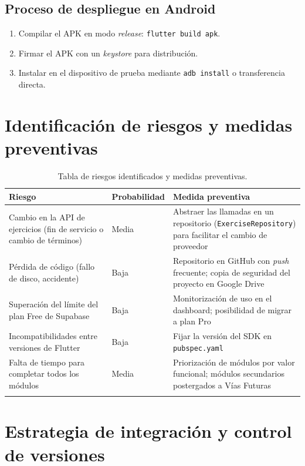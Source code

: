 \subsection{Proceso de despliegue en Android}

\begin{enumerate}
  \item Compilar el APK en modo \textit{release}: \texttt{flutter build apk}.
  \item Firmar el APK con un \textit{keystore} para distribución.
  \item Instalar en el dispositivo de prueba mediante \texttt{adb install} o transferencia directa.
\end{enumerate}

\section{Identificación de riesgos y medidas preventivas}

\begin{longtable}{@{}p{5cm}p{3cm}p{6cm}@{}}
\toprule
\textbf{Riesgo} & \textbf{Probabilidad} & \textbf{Medida preventiva} \\
\midrule
\endhead
Cambio en la API de ejercicios (fin de servicio o cambio de términos) & Media & Abstraer las llamadas en un repositorio (\texttt{ExerciseRepository}) para facilitar el cambio de proveedor \\
Pérdida de código (fallo de disco, accidente) & Baja & Repositorio en GitHub con \textit{push} frecuente; copia de seguridad del proyecto en Google Drive \\
Superación del límite del plan Free de Supabase & Baja & Monitorización de uso en el dashboard; posibilidad de migrar a plan Pro \\
Incompatibilidades entre versiones de Flutter & Baja & Fijar la versión del SDK en \texttt{pubspec.yaml} \\
Falta de tiempo para completar todos los módulos & Media & Priorización de módulos por valor funcional; módulos secundarios postergados a Vías Futuras \\
\bottomrule
\caption{Tabla de riesgos identificados y medidas preventivas.}
\end{longtable}

\section{Estrategia de integración y control de versiones}

